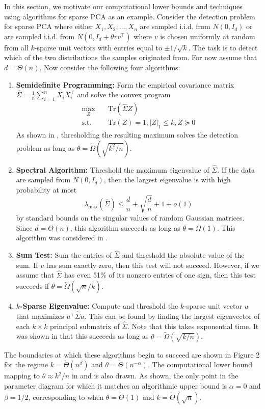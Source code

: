 \documentclass[11pt]{article}
\begin{document}
In this section, we motivate our computational lower bounds and techniques using algorithms for sparse PCA as an example. Consider the detection problem for sparse PCA where either $X_1, X_2, \dots, X_n$ are sampled i.i.d. from $N(0, I_d)$ or are sampled i.i.d. from $N(0, I_d + \theta vv^\top)$ where $v$ is chosen uniformly at random from all $k$-sparse unit vectors with entries equal to $\pm 1/\sqrt{k}$. The task is to detect which of the two distributions the samples originated from. For now assume that $d = \Theta(n)$. Now consider the following four algorithms:
\begin{enumerate}
\item \textbf{Semidefinite Programming:} Form the empirical covariance matrix $\hat{\Sigma} = \frac{1}{n} \sum_{i = 1}^n X_i X_i^\top$ and solve the convex program
\begin{align*}
\max_Z \quad &\text{Tr}\left(\hat{\Sigma} Z\right) \\
\text{s.t.} \quad &\text{Tr}(Z) = 1, |Z|_1 \le k, Z \succeq 0
\end{align*}
As shown in \cite{berthet2013complexity}, thresholding the resulting maximum solves the detection problem as long as $\theta = \tilde{\Omega}(\sqrt{k^2/n})$.
\item \textbf{Spectral Algorithm:} Threshold the maximum eigenvalue of $\hat{\Sigma}$. If the data are sampled from $N(0, I_d)$, then the largest eigenvalue is with high probability at most
$$\lambda_{\text{max}}(\hat{\Sigma}) \le \frac{d}{n} + \sqrt{\frac{d}{n}} + 1 + o(1)$$
by standard bounds on the singular values of random Gaussian matrices. Since $d = \Theta(n)$, this algorithm succeeds as long as $\theta = \Omega(1)$. This algorithm was considered in \cite{krauthgamer2015semidefinite}.
\item \textbf{Sum Test:} Sum the entries of $\hat{\Sigma}$ and threshold the absolute value of the sum. If $v$ has sum exactly zero, then this test will not succeed. However, if we assume that $\hat{\Sigma}$ has even 51\% of its nonzero entries of one sign, then this test succeeds if $\theta = \tilde{\Omega}(\sqrt{n}/k)$.
\item \textbf{$k$-Sparse Eigenvalue:} Compute and threshold the $k$-sparse unit vector $u$ that maximizes $u^\top \hat{\Sigma} u$. This can be found by finding the largest eigenvector of each $k \times k$ principal submatrix of $\hat{\Sigma}$. Note that this takes exponential time. It was shown in \cite{berthet2013complexity} that this succeeds as long as $\theta = \tilde{\Omega}(\sqrt{k/n})$.
\end{enumerate}
The boundaries at which these algorithms begin to succeed are shown in Figure 2 for the regime $k = \tilde{\Theta}(n^\beta)$ and $\theta = \tilde{\Theta}(n^{-\alpha})$. The computational lower bound mapping to $\theta \approx k^2/n$ in \cite{berthet2013complexity} and \cite{gao2017sparse} is also drawn. As shown, the only point in the parameter diagram for which it matches an algorithmic upper bound is $\alpha = 0$ and $\beta = 1/2$, corresponding to when $\theta = \tilde{\Theta}(1)$ and $k = \tilde{\Theta}(\sqrt{n})$.
\end{document}
